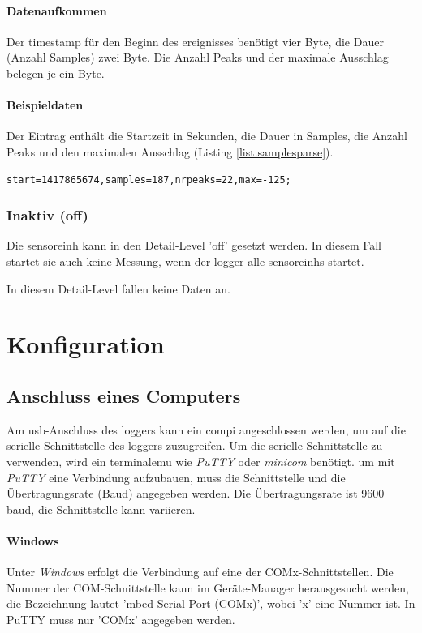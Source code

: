 \paragraph{Datenaufkommen} Der \gls{timestamp} für den Beginn des \gls{ereignis}ses benötigt vier Byte, die Dauer (Anzahl Samples) zwei Byte. Die Anzahl Peaks und der maximale Ausschlag belegen je ein Byte.

\paragraph{Beispieldaten} Der Eintrag enthält die Startzeit in Sekunden, die Dauer in Samples, die Anzahl Peaks und den maximalen Ausschlag (Listing \ref{list.samplesparse}). 
\begin{lstlisting}[caption=Beispieldaten auf Detail-Level 'sparse', label=list.samplesparse]
start=1417865674,samples=187,nrpeaks=22,max=-125;
\end{lstlisting}

\subsubsection{Inaktiv (off)}
Die \gls{sensoreinh} kann in den Detail-Level 'off' gesetzt werden. In diesem Fall startet sie auch keine Messung, wenn der \gls{logger} alle \glspl{sensoreinh} startet.

In diesem Detail-Level fallen keine Daten an.


\section{Konfiguration}\label{sec.manualkonfig}


\subsection{Anschluss eines Computers}\label{ssec.manualserial}
Am \gls{usb}-Anschluss des \gls{logger}s kann ein \gls{compi} angeschlossen werden, um auf die serielle Schnittstelle des \gls{logger}s zuzugreifen. Um die serielle Schnittstelle zu verwenden, wird ein \gls{terminalemu} wie \emph{PuTTY} oder \emph{minicom} benötigt. um mit \emph{PuTTY} eine Verbindung aufzubauen, muss die Schnittstelle und die Übertragungsrate (Baud) angegeben werden. Die Übertragungsrate ist 9600 baud, die Schnittstelle kann variieren. 

\paragraph{Windows} Unter \emph{Windows} erfolgt die Verbindung auf eine der COMx-Schnittstellen. Die Nummer der COM-Schnittstelle kann im Geräte-Manager herausgesucht werden, die Bezeichnung lautet 'mbed Serial Port (COMx)', wobei 'x' eine Nummer ist. In PuTTY muss nur 'COMx' angegeben werden.

